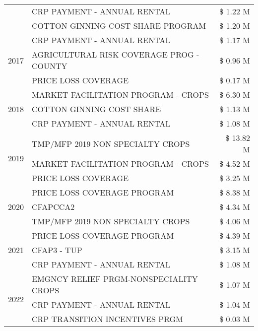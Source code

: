 \begin{tabular}{llr}
 & CRP PAYMENT - ANNUAL RENTAL & \$ 1.22 M \\
 & COTTON GINNING COST SHARE PROGRAM & \$ 1.20 M \\
\cline{1-3}
\multirow[t]{3}{*}{2017} & CRP PAYMENT - ANNUAL RENTAL & \$ 1.17 M \\
 & AGRICULTURAL RISK COVERAGE PROG - COUNTY & \$ 0.96 M \\
 & PRICE LOSS COVERAGE & \$ 0.17 M \\
\cline{1-3}
\multirow[t]{3}{*}{2018} & MARKET FACILITATION PROGRAM - CROPS & \$ 6.30 M \\
 & COTTON GINNING COST SHARE & \$ 1.13 M \\
 & CRP PAYMENT - ANNUAL RENTAL & \$ 1.08 M \\
\cline{1-3}
\multirow[t]{3}{*}{2019} & TMP/MFP 2019 NON SPECIALTY CROPS & \$ 13.82 M \\
 & MARKET FACILITATION PROGRAM - CROPS & \$ 4.52 M \\
 & PRICE LOSS COVERAGE & \$ 3.25 M \\
\cline{1-3}
\multirow[t]{3}{*}{2020} & PRICE LOSS COVERAGE PROGRAM & \$ 8.38 M \\
 & CFAPCCA2 & \$ 4.34 M \\
 & TMP/MFP 2019 NON SPECIALTY CROPS & \$ 4.06 M \\
\cline{1-3}
\multirow[t]{3}{*}{2021} & PRICE LOSS COVERAGE PROGRAM & \$ 4.39 M \\
 & CFAP3 - TUP & \$ 3.15 M \\
 & CRP PAYMENT - ANNUAL RENTAL & \$ 1.08 M \\
\cline{1-3}
\multirow[t]{3}{*}{2022} & EMGNCY RELIEF PRGM-NONSPECIALITY CROPS & \$ 1.07 M \\
 & CRP PAYMENT - ANNUAL RENTAL & \$ 1.04 M \\
 & CRP TRANSITION INCENTIVES PRGM & \$ 0.03 M \\
\cline{1-3}
\bottomrule
\end{tabular}
